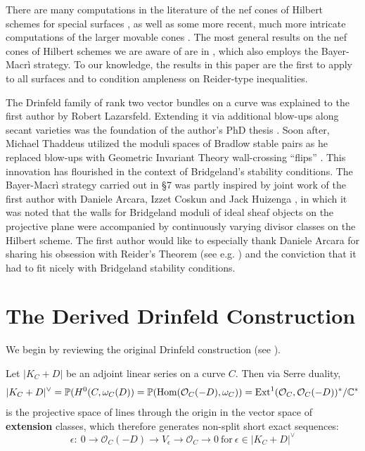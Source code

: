 \documentclass{amsart}
\begin{document}
\medskip

There are many computations in the literature of the nef cones of Hilbert schemes for {special} surfaces  \cite{ABCH, Ry, BeC, BM1, BeC}, 
as well as some more recent, much more intricate computations of the larger movable cones  \cite{Ar, Bou, GrR}. 
The most general results on the nef cones of Hilbert schemes we are aware of are in \cite{BHLRS}, which also employs the Bayer-Macr\`i  strategy.
To our knowledge,  the results in this paper are the first  to apply to all surfaces and to condition ampleness on 
Reider-type inequalities. 

\medskip

 The Drinfeld family of rank two vector bundles on a curve was explained to the first author by Robert Lazarsfeld. 
Extending it via additional blow-ups along secant varieties was the foundation of the author's PhD thesis \cite{Be}. Soon after, Michael Thaddeus utilized the
moduli spaces of Bradlow stable pairs as he replaced  blow-ups with Geometric Invariant Theory wall-crossing ``flips'' \cite{Th}. This innovation has
 flourished in the context of Bridgeland's stability conditions. The Bayer-Macr\`i strategy carried out in \S 7 
was partly inspired by joint work of the first author with Daniele Arcara, Izzet Coskun and Jack Huizenga \cite{ABCH}, in which it was noted that the walls for 
Bridgeland moduli of ideal sheaf objects on the projective plane were accompanied by continuously varying divisor classes on the Hilbert scheme. The first author would like 
to especially thank Daniele Arcara for sharing his obsession with Reider's Theorem (see e.g. \cite{AB2, LT}) and the conviction that it had to fit nicely with
Bridgeland stability conditions. 
 


\newpage

\section{The Derived Drinfeld Construction}

We begin by reviewing the original Drinfeld construction (see \cite{Be}). 

\medskip

Let $|K_C + D|$ be an adjoint linear series on a curve $C$. Then via Serre duality, 
\[ |K_C + D|^\vee =  {\mathbb P}(H^0(C,\omega_C(D)) = {\mathbb P}(\mbox{Hom}({\mathcal O}_C(-D), \omega_C)) = \mbox{Ext}^1({\mathcal O}_C, {\mathcal O}_C(-D))^*/{\mathbb C}^* \] 
is the projective space of lines through the origin in the vector space of {\bf extension} classes, which 
therefore generates non-split short exact sequences: 
\[ \epsilon: \ 0 \rightarrow {\mathcal O}_C(-D) \rightarrow V_\epsilon \rightarrow {\mathcal O}_C \rightarrow 0\ \mbox{for} \ \epsilon \in |K_C + D|^\vee  \] 
\end{document}
